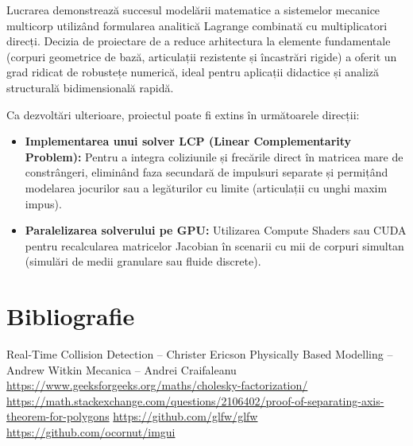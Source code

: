 \documentclass[12pt, a4paper]{article}
\begin{document}
Lucrarea demonstrează succesul modelării matematice a sistemelor mecanice multicorp utilizând formularea analitică Lagrange combinată cu multiplicatori direcți. Decizia de proiectare de a reduce arhitectura la elemente fundamentale (corpuri geometrice de bază, articulații rezistente și încastrări rigide) a oferit un grad ridicat de robustețe numerică, ideal pentru aplicații didactice și analiză structurală bidimensională rapidă.

Ca dezvoltări ulterioare, proiectul poate fi extins în următoarele direcții:
\begin{itemize}
    \item \textbf{Implementarea unui solver LCP (Linear Complementarity Problem):} Pentru a integra coliziunile și frecările direct în matricea mare de constrângeri, eliminând faza secundară de impulsuri separate și permițând modelarea jocurilor sau a legăturilor cu limite (articulații cu unghi maxim impus).
    \item \textbf{Paralelizarea solverului pe GPU:} Utilizarea Compute Shaders sau CUDA pentru recalcularea matricelor Jacobian în scenarii cu mii de corpuri simultan (simulări de medii granulare sau fluide discrete).
\end{itemize}

\section*{Bibliografie}

\begin{thebibliography}{ }
 Real-Time Collision Detection -- Christer Ericson
 Physically Based Modelling -- Andrew Witkin
 Mecanica -- Andrei Craifaleanu
 \url{ https://www.geeksforgeeks.org/maths/cholesky-factorization/ }
 \url{https://math.stackexchange.com/questions/2106402/proof-of-separating-axis-theorem-for-polygons}
 \url{https://github.com/glfw/glfw}
 \url{https://github.com/ocornut/imgui}

\end{thebibliography}
\end{document}
